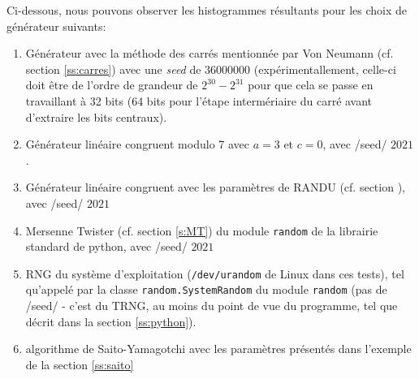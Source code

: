 \documentclass{scrartcl}
\begin{document}
Ci-dessous, nous pouvons observer les histogrammes résultants pour les choix de
générateur suivants:
\begin{enumerate}
\item Générateur avec la méthode des carrés mentionnée par Von Neumann
  (cf. section \ref{ss:carres}) avec une \textit{seed} de $36000000$
  (expérimentallement, celle-ci doit être de l'ordre de grandeur de
  $2^{30}-2^{31}$ pour que cela se passe en travaillant à 32 bits (64 bits pour
  l'étape intermériaire du carré avant d'extraire les bits centraux).
\item Générateur linéaire congruent modulo 7 avec $a=3$ et $c=0$, avec /seed/ $2021$.
\item Générateur linéaire congruent avec les paramètres de RANDU (cf. section
  \label{ss:randu}), avec /seed/ $2021$
\item Mersenne Twister (cf. section \ref{s:MT}) du module \texttt{random} de la librairie standard de
  python, avec /seed/ $2021$
\item RNG du système d'exploitation (\texttt{/dev/urandom} de Linux dans ces
  tests), tel qu'appelé par la classe \texttt{random.SystemRandom} du module
  \texttt{random} (pas de /seed/ - c'est du TRNG, au moins du point de vue du
  programme, tel que décrit dans la section \ref{ss:python}).
\item algorithme de Saito-Yamagotchi avec les paramètres présentés dans
  l'exemple de la section \ref{ss:saito}
\end{enumerate}
\end{document}
